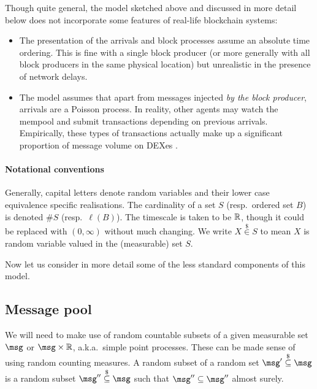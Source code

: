 \documentclass[a4paper,11pt]{article}
\begin{document}
\begin{remark}

  Though quite general, the model sketched above and discussed in more detail below does not incorporate some features of real-life blockchain systems:
  \begin{itemize}

  \item The presentation of the arrivals and block processes assume an absolute time ordering. This is fine with a single block producer (or more generally with all block producers in the same physical location) but unrealistic in the presence of network delays.
  
  \item The model assumes that apart from messages injected \emph{by the block producer}, arrivals are a Poisson process. In reality, other agents may watch the mempool and submit transactions depending on previous arrivals.
  Empirically, these types of transactions actually make up a significant proportion of message volume on DEXes \cite{alexthuniswap}.
  
  \end{itemize}
  
\end{remark}

\paragraph{Notational conventions}

Generally, capital letters denote random variables and their lower case equivalence specific realisations. The cardinality of a set $S$ (resp.~ordered set $B$) is denoted $\# S$ (resp.~$\ell(B)$).
%
The timescale is taken to be $\mathbb R$, though it could be replaced with $(0,\infty)$ without much changing.
%
We write $X\stackrel{\$}{\in}S$ to mean $X$ is random variable valued in the (measurable) set $S$.


Now let us consider in more detail some of the less standard components of this model.



\subsection{Message pool}

We will need to make use of random countable subsets of a given measurable set $\msg$ or $\msg\times\R$, a.k.a.~simple point processes.
%
These can be made sense of using random counting measures.
%
A random subset of a random set $\msg'\stackrel{\$}{\subseteq}\msg$ is a random subset $\msg''\stackrel{\$}{\subseteq}\msg$ such that $\msg''\subseteq\msg''$ almost surely.
\end{document}
